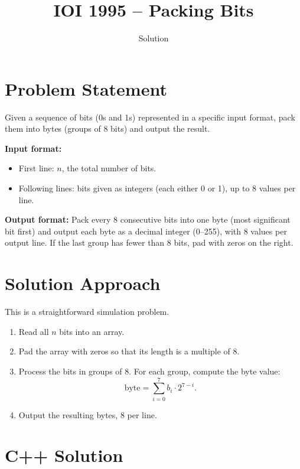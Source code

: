 \documentclass[11pt,a4paper]{article}
\title{IOI 1995 -- Packing Bits}
\author{Solution}
\date{}
\begin{document}
\maketitle

\section{Problem Statement}

Given a sequence of bits (0s and 1s) represented in a specific input format,
pack them into bytes (groups of 8 bits) and output the result.

\medskip
\noindent\textbf{Input format:}
\begin{itemize}
  \item First line: $n$, the total number of bits.
  \item Following lines: bits given as integers (each either 0 or 1),
        up to 8 values per line.
\end{itemize}

\noindent\textbf{Output format:}
Pack every 8 consecutive bits into one byte (most significant bit first) and output
each byte as a decimal integer (0--255), with 8 values per output line.
If the last group has fewer than 8 bits, pad with zeros on the right.

\section{Solution Approach}

This is a straightforward simulation problem.

\begin{enumerate}
  \item Read all $n$ bits into an array.
  \item Pad the array with zeros so that its length is a multiple of 8.
  \item Process the bits in groups of 8. For each group, compute the byte value:
        \[
          \text{byte} = \sum_{i=0}^{7} b_i \cdot 2^{7-i}.
        \]
  \item Output the resulting bytes, 8 per line.
\end{enumerate}

\section{C++ Solution}
\end{document}
